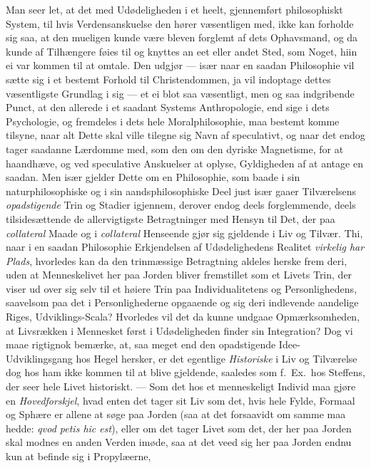 \documentclass[12pt,a4paper]{book}
\newcommand{\apage}[1]{\marginnote{\footnotesize\textit{[#1]}}}
\begin{document}
Man seer let, at det med Udødeligheden i et heelt, gjennemført philosophiskt
System, til hvis Verdensanskuelse den hører væsentligen med, ikke kan
forholde sig saa, at den mueligen kunde være bleven forglemt af dets
Ophavsmand, og da kunde af Tilhængere føies til og knyttes an eet eller
andet Sted, som Noget, hiin ei var kommen til at omtale. Den udgjør ---
især naar en saadan Philosophie vil sætte sig i et bestemt Forhold til
Christendommen, ja vil indoptage dettes væsentligste Grundlag i sig --- et
ei blot saa væsentligt, men og saa indgribende Punct, at den allerede i et
saadant Systems Anthropologie, end sige i dets Psychologie, og fremdeles i
dets hele Moralphilosophie, maa bestemt komme tilsyne, naar alt Dette skal
ville tilegne sig Navn af speculativt, og naar det endog tager saadanne
Lærdomme med, som den om den dyriske Magnetisme, for at haandhæve, og ved
speculative Anskuelser at oplyse, Gyldigheden af at antage en saadan. Men
især gjelder Dette om en Philosophie, som baade i sin naturphilosophiske og
i sin aandsphilosophiske Deel just især gaaer Tilværelsens \emph{opadstigende}
Trin og Stadier igjennem, derover endog deels forglemmende, deels
tilsidesættende de allervigtigste Betragtninger med Hensyn til Det, der paa
\emph{collateral} Maade og i \emph{collateral} Henseende gjør sig gjeldende i Liv og
Tilvær. Thi, naar i en saadan Philosophie Erkjendelsen af Udødelighedens \apage{13}
Realitet \emph{virkelig har Plads}, hvorledes kan da den trinmæssige Betragtning
aldeles herske frem deri, uden at Menneskelivet her paa Jorden bliver
fremstillet som et Livets Trin, der viser ud over sig selv til et høiere
Trin paa Individualitetens og Personlighedens, saavelsom paa det i
Personlighederne opgaaende og sig deri indlevende aandelige Riges,
Udviklings-Scala? Hvorledes vil det da kunne undgaae Opmærksomheden, at
Livsrækken i Mennesket først i Udødeligheden finder sin Integration? Dog vi
maae rigtignok bemærke, at, saa meget end den opadstigende Idee-Udviklings\-gang
hos Hegel hersker, er det egentlige \emph{Historiske} i Liv og Tilværelse dog hos
ham ikke kommen til at blive gjeldende, saaledes som f.\ Ex.\ hos Steffens,
der seer hele Livet historiskt. --- Som det hos et menneskeligt Individ maa
gjøre en \emph{Hovedforskjel}, hvad enten det tager sit Liv som det, hvis hele
Fylde, Formaal og Sphære er allene at søge paa Jorden (saa at det
forsaavidt om samme maa hedde: \textit{qvod petis hic est}), eller om det
tager Livet som det, der her paa Jorden skal modnes en anden Verden imøde,
saa at det veed sig her paa Jorden endnu kun at befinde sig i Propylæerne,
\end{document}
